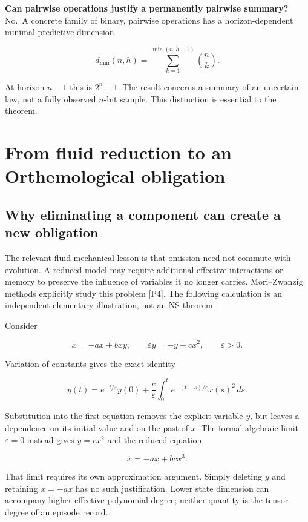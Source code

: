 \documentclass[11pt,a4paper]{article}
\begin{document}
\textbf{Can pairwise operations justify a permanently pairwise summary?}
No.~A concrete family of binary, pairwise operations has a
horizon-dependent minimal predictive dimension

\nopagebreak[4]

\[
\boxed{
 d_{\min}(n,h)=\sum_{k=1}^{\min(n,h+1)}\binom nk.
}
\]

At horizon \(n-1\) this is \(2^n-1\). The result concerns a summary of
an uncertain law, not a fully observed \(n\)-bit sample. This
distinction is essential to the theorem.

\section{From fluid reduction to an Orthemological
obligation}\label{from-fluid-reduction-to-an-orthemological-obligation}

\subsection{Why eliminating a component can create a new
obligation}\label{why-eliminating-a-component-can-create-a-new-obligation}

The relevant fluid-mechanical lesson is that omission need not commute
with evolution. A reduced model may require additional effective
interactions or memory to preserve the influence of variables it no
longer carries. Mori--Zwanzig methods explicitly study this problem
{[}P4{]}. The following calculation is an independent elementary
illustration, not an NS theorem.

Consider

\nopagebreak[4]

\[
\dot x=-ax+bxy,\qquad
\varepsilon\dot y=-y+cx^2,\qquad\varepsilon>0.
\]

Variation of constants gives the exact identity

\nopagebreak[4]

\[
y(t)=e^{-t/\varepsilon}y(0)
 +\frac c\varepsilon\int_0^t e^{-(t-s)/\varepsilon}x(s)^2\,ds.
\]

Substitution into the first equation removes the explicit variable
\(y\), but leaves a dependence on its initial value and on the past of
\(x\). The formal algebraic limit \(\varepsilon=0\) instead gives
\(y=cx^2\) and the reduced equation

\nopagebreak[4]

\[
\dot x=-ax+bcx^3.
\]

That limit requires its own approximation argument. Simply deleting
\(y\) and retaining \(\dot x=-ax\) has no such justification. Lower
state dimension can accompany higher effective polynomial degree;
neither quantity is the tensor degree of an episode record.
\end{document}
